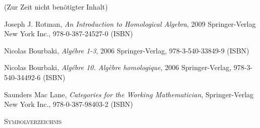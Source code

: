 \documentclass[a4paper]{amsart}
\theoremstyle{definition}
\begin{document}
\begin{backup}
    (Zur Zeit nicht benötigter Inhalt)
\end{backup}

\begin{thebibliography}{9}
   	Joseph J. Rotman, \emph{An Introduction to Homological Algebra},
   	2009 Springer-Verlag New York Inc., 978-0-387-24527-0 (ISBN)

      Nicolas Bourbaki, \emph{Algébre 1-3},
      2006 Springer-Verlag, 978-3-540-33849-9 (ISBN)

      Nicolas Bourbaki, \emph{Algébre 10. Algèbre homologique},
      2006 Springer-Verlag, 978-3-540-34492-6 (ISBN)

      Saunders Mac Lane, \emph{Categories for the Working Mathematician},
      Springer-Verlag New York Inc., 978-0-387-98403-2 (ISBN)

\end{thebibliography}

\begin{large}
    \centerline{\textsc{Symbolverzeichnis}}
\end{large}
\bigskip

\renewcommand*{\arraystretch}{1}
\end{document}
